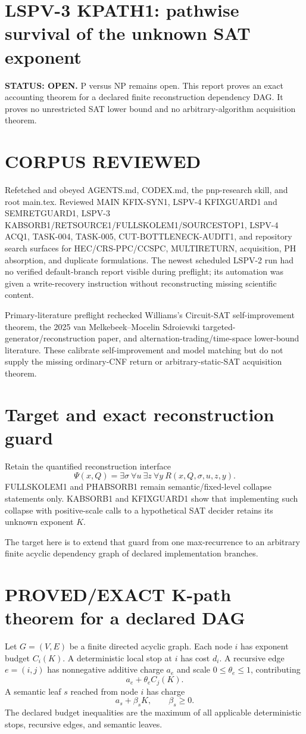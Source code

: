 \documentclass[11pt]{article}
\begin{document}
\section*{LSPV-3 KPATH1: pathwise survival of the unknown SAT exponent}
\textbf{STATUS: OPEN.} P versus NP remains open. This report proves an exact accounting theorem for a declared finite reconstruction dependency DAG. It proves no unrestricted SAT lower bound and no arbitrary-algorithm acquisition theorem.

\section*{CORPUS REVIEWED}
Refetched and obeyed AGENTS.md, CODEX.md, the pnp-research skill, and root main.tex. Reviewed MAIN KFIX-SYN1, LSPV-4 KFIXGUARD1 and SEMRETGUARD1, LSPV-3 KABSORB1/RETSOURCE1/FULLSKOLEM1/SOURCESTOP1, LSPV-4 ACQ1, TASK-004, TASK-005, CUT-BOTTLENECK-AUDIT1, and repository search surfaces for HEC/CRS-PPC/CCSPC, MULTIRETURN, acquisition, PH absorption, and duplicate formulations. The newest scheduled LSPV-2 run had no verified default-branch report visible during preflight; its automation was given a write-recovery instruction without reconstructing missing scientific content.

Primary-literature preflight rechecked Williams's Circuit-SAT self-improvement theorem, the 2025 van Melkebeek--Mocelin Sdroievski targeted-generator/reconstruction paper, and alternation-trading/time-space lower-bound literature. These calibrate self-improvement and model matching but do not supply the missing ordinary-CNF return or arbitrary-static-SAT acquisition theorem.

\section*{Target and exact reconstruction guard}
Retain the quantified reconstruction interface
\[
\Psi(x,Q)=\exists \sigma\ \forall u\ \exists z\ \forall y\ R(x,Q,\sigma,u,z,y).
\]
FULLSKOLEM1 and PHABSORB1 remain semantic/fixed-level collapse statements only. KABSORB1 and KFIXGUARD1 show that implementing such collapse with positive-scale calls to a hypothetical SAT decider retains its unknown exponent \(K\).

The target here is to extend that guard from one max-recurrence to an arbitrary finite acyclic dependency graph of declared implementation branches.

\section*{PROVED/EXACT K-path theorem for a declared DAG}
Let \(G=(V,E)\) be a finite directed acyclic graph. Each node \(i\) has exponent budget \(C_i(K)\). A deterministic local stop at \(i\) has cost \(d_i\). A recursive edge \(e=(i,j)\) has nonnegative additive charge \(a_e\) and scale \(0\le\theta_e\le1\), contributing
\[
a_e+\theta_e C_j(K).
\]
A semantic leaf \(s\) reached from node \(i\) has charge
\[
a_s+\beta_s K,\qquad \beta_s\ge0.
\]
The declared budget inequalities are the maximum of all applicable deterministic stops, recursive edges, and semantic leaves.
\end{document}
